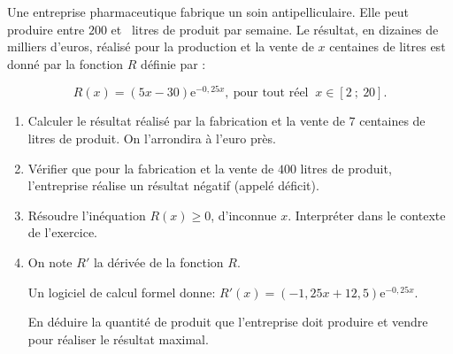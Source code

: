 \medskip

Une entreprise pharmaceutique fabrique un soin antipelliculaire. Elle peut produire entre $200$ et ~litres de produit par semaine. Le résultat, en dizaines de milliers d'euros, réalisé pour la production et la vente de $x$ centaines de litres est donné par la fonction $R$ définie par :

\[R(x) = (5x - 30)\text{e}^{-0,25x},\:  \text{pour tout réel }\: x \in  [2~;~20].\]

\smallskip

\begin{enumerate}
\item Calculer le résultat réalisé par la fabrication et la vente de $7$ centaines de litres de produit. On l'arrondira à l'euro près.
\item  Vérifier que pour la fabrication et la vente de $400$ litres de produit, l'entreprise réalise un résultat négatif (appelé déficit).
\item  Résoudre l'inéquation $R(x) \geqslant 0$, d'inconnue $x$. Interpréter dans le contexte de l'exercice.
\item  On note $R'$ la dérivée de la fonction $R$.

Un logiciel de calcul formel donne: $R'(x) = (- 1,25x + 12,5)\text{e}^{-0,25x}$.

En déduire la quantité de produit que l'entreprise doit produire et vendre pour réaliser le résultat maximal.
\end{enumerate}

\bigskip
